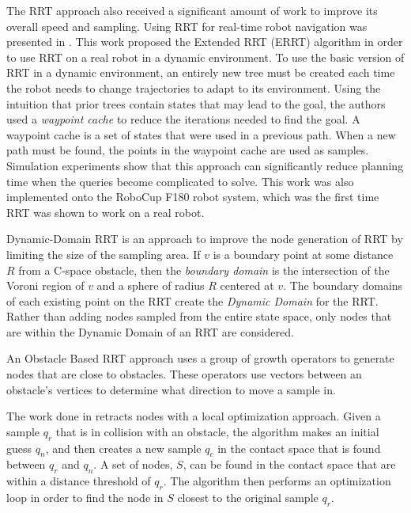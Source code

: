 \documentclass[10pt,conference]{ieeeconf}
\begin{document}
The RRT approach also received a significant amount of work to improve its overall speed and sampling. Using RRT for real-time robot navigation was presented in \cite{bruce2002real}. This work proposed the Extended RRT (ERRT) algorithm in order to use RRT on a real robot in a dynamic environment. To use the basic version of RRT in a dynamic environment, an entirely new tree must be created each time the robot needs to change trajectories to adapt to its environment. Using the intuition that prior trees contain states that may lead to the goal, the authors used a \emph{waypoint cache} to reduce the iterations needed to find the goal. A waypoint cache is a set of states that were used in a previous path. When a new path must be found, the points in the waypoint cache are used as samples. Simulation experiments show that this approach can significantly reduce planning time when the queries become complicated to solve. This work was also implemented onto the RoboCup F180 robot system, which was the first time RRT was shown to work on a real robot. 

Dynamic-Domain RRT \cite{yershova2005dynamic} is an approach to improve the node generation of RRT by limiting the size of the sampling area. If $v$ is a boundary point at some distance $R$ from a C-space obstacle, then the \emph{boundary domain} is the intersection of the Voroni region of $v$ and a sphere of radius $R$ centered at $v$. The boundary domains of each existing point on the RRT create the \emph{Dynamic Domain} for the RRT. Rather than adding nodes sampled from the entire state space, only nodes that are within the Dynamic Domain of an RRT are considered.

An Obstacle Based RRT approach \cite{tang2006obstacle} uses a group of growth operators to generate nodes that are close to obstacles. These operators use vectors between an obstacle's vertices to determine what direction to move a sample in. 

The work done in \cite{zhang2008efficient} retracts nodes with a local optimization approach. Given a sample $q_r$ that is in collision with an obstacle, the algorithm makes an initial guess $q_n$, and then creates a new sample $q_c$ in the contact space that is found between $q_r$ and $q_n$. A set of nodes, $S$, can be found in the contact space that are within a distance threshold of $q_r$. The algorithm then performs an optimization loop in order to find the node in $S$ closest to the original sample $q_r$.
\end{document}
